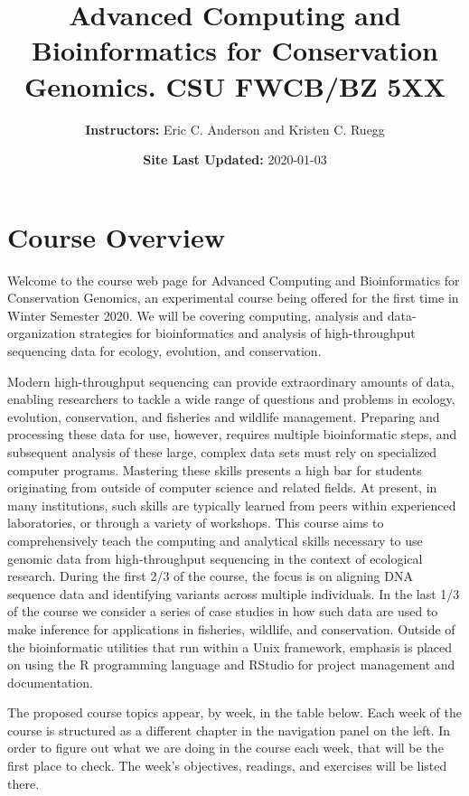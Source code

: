 \documentclass[]{book}
\title{Advanced Computing and Bioinformatics for Conservation Genomics. CSU FWCB/BZ 5XX}
\author{\textbf{Instructors:} Eric C. Anderson and Kristen C. Ruegg}
\date{\textbf{Site Last Updated:} 2020-01-03}
\begin{document}
\maketitle

{
\setcounter{tocdepth}{1}
\tableofcontents
}
\hypertarget{course-overview}{%
\chapter*{Course Overview}\label{course-overview}}

Welcome to the course web page for Advanced Computing and Bioinformatics for Conservation Genomics,
an experimental course being offered for the first time in Winter Semester 2020. We will be covering
computing, analysis and data-organization strategies for bioinformatics and analysis of high-throughput sequencing data for ecology,
evolution, and conservation.

Modern high-throughput sequencing can provide extraordinary amounts of data, enabling researchers to tackle a wide range of questions and problems in ecology, evolution, conservation, and fisheries and wildlife management. Preparing and processing these data for use, however, requires multiple bioinformatic steps, and subsequent analysis of these large, complex data sets must rely on specialized computer programs. Mastering these skills presents a high bar for students originating from outside of computer science and related fields. At present, in many institutions, such skills are typically learned from peers within experienced laboratories, or through a variety of workshops. This course aims to comprehensively teach the computing and analytical skills necessary to use genomic data from high-throughput sequencing in the context of ecological research. During the first 2/3 of the course, the focus is on aligning DNA sequence data and identifying variants across multiple individuals. In the last 1/3 of the course we consider a series of case studies in how such data are used to make inference for applications in fisheries, wildlife, and conservation. Outside of the bioinformatic utilities that run within a Unix framework, emphasis is placed on using the R programming language and RStudio for project management and documentation.

The proposed course
topics appear, by week, in the table below. Each week of the course is structured as a different
chapter in the navigation panel on the left. In order to figure out what we are doing in the course
each week, that will be the first place to check. The week's objectives, readings, and exercises will
be listed there.
\end{document}
